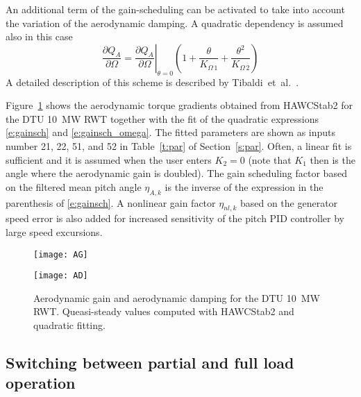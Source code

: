 An additional term of the gain-scheduling can be activated to take into account the variation of the aerodynamic damping. A quadratic dependency is assumed also in this case
\begin{equation}\label{e:gainsch_omega}
\frac{\partial Q_A}{\partial \Omega}= \left. \frac{\partial Q_A}{\partial \Omega}\right|_{\theta=0}\left(1 + \frac{\theta}{K_{\Omega\,1}} + \frac{\theta^2}{K_{\Omega\,2}}\right)
\end{equation}
A detailed description of this scheme is described by Tibaldi~et~al.~\cite{tibaldi_effects_2014}.

Figure~\ref{f:gainsch} shows the aerodynamic torque gradients obtained from HAWCStab2 for the DTU 10~MW RWT together with the fit of the quadratic expressions \eqref{e:gainsch} and \eqref{e:gainsch_omega}. The fitted parameters are shown as inputs number 21, 22, 51, and 52 in Table~\ref{t:par} of Section~\ref{s:par}. Often, a linear fit is sufficient and it is assumed when the user enters $K_2=0$ (note that $K_1$ then is the angle where the aerodynamic gain is doubled). The gain scheduling factor based on the filtered mean pitch angle $\eta_{A,k}$ is the inverse of the expression in the parenthesis of \eqref{e:gainsch}. A nonlinear gain factor $\eta_{nl,k}$ based on the generator speed error is also added for increased sensitivity of the pitch PID controller by large speed excursions.


\begin{figure}[!t]
\begin{center}
\parbox{0.45\columnwidth}{\mbox{\texttt{[image: AG]}}}\quad
\parbox{0.5\columnwidth}{\mbox{\texttt{[image: AD]}}}
\caption{Aerodynamic gain and aerodynamic damping for the DTU 10~MW RWT. Queasi-steady values computed with HAWCStab2 and quadratic fitting.}\label{f:gainsch}
\end{center}
\end{figure}

\subsection{Switching between partial and full load operation}

